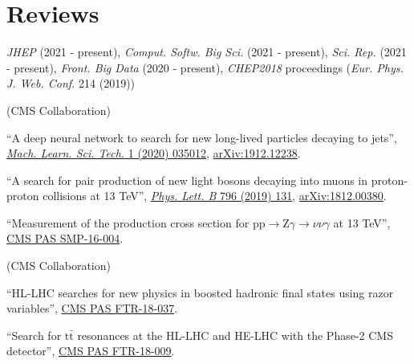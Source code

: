 \section{Reviews}
\begin{description}[leftmargin=12pt,font=\normalfont\textit]
\item[Journal referee:]
\begin{description}[leftmargin=12pt,font=\normalfont,labelsep=0em]\item[]
\item \emph{JHEP} (2021 - present), \emph{Comput. Softw. Big Sci.} (2021 - present), \emph{Sci. Rep.} (2021 - present), \emph{Front. Big Data} (2020 - present), \emph{CHEP2018} proceedings (\emph{Eur. Phys. J. Web. Conf.} 214 (2019))
\end{description}
\item[Analysis Review Committee (ARC) member:] (CMS Collaboration)
\begin{description}[leftmargin=12pt,font=\normalfont,labelsep=0em]
\item ``A deep neural network to search for new long-lived particles decaying to jets'', \href{https://doi.org/10.1088/2632-2153/ab9023}{\emph{Mach. Learn. Sci. Tech.} 1 (2020) 035012}, \href{https://arxiv.org/abs/1912.12238}{arXiv:1912.12238}.
\item \begin{sloppypar}``A search for pair production of new light bosons decaying into muons in proton-proton collisions at 13 TeV'', \href{http://dx.doi.org/10.1016/j.physletb.2019.07.013}{\emph{Phys. Lett. B} 796 (2019) 131}, \href{https://arxiv.org/abs/1812.00380}{arXiv:1812.00380}.\end{sloppypar}
\item ``Measurement of the production cross section for $\text{p}\text{p} \to \text{Z}\gamma \to \nu\nu\gamma$ at 13 TeV'', \href{https://cds.cern.ch/record/2204922}{CMS PAS SMP-16-004}.
\end{description}
\item[CMS Certified Language Editor (CCLE):] (CMS Collaboration)
\begin{description}[leftmargin=12pt,font=\normalfont,labelsep=0em]
\item ``HL-LHC searches for new physics in boosted hadronic final states using razor variables'', \href{https://cds.cern.ch/record/2658262}{CMS PAS FTR-18-037}.
\item ``Search for $\text{t}\bar{\text{t}}$ resonances at the HL-LHC and HE-LHC with the Phase-2 CMS detector'', \href{https://cds.cern.ch/record/2649032}{CMS PAS FTR-18-009}.

\end{description}
\end{description}
